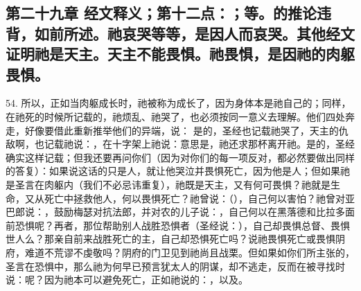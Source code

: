 
\subsection{第二十九章 经文释义；第十二点：；等。的推论违背，如前所述。祂哀哭等等，是因人而哀哭。其他经文证明祂是天主。天主不能畏惧。祂畏惧，是因祂的肉躯畏惧。}

54. 所以，正如当肉躯成长时，祂被称为成长了，因为身体本是祂自己的；同样，在祂死的时候所记载的，祂烦乱、祂哭了，也必须按同一意义去理解。他们四处奔走，好像要借此重新推举他们的异端，说： 是的，圣经也记载祂哭了，天主的仇敌啊，也记载祂说：，在十字架上祂说：意思是，祂还求那杯离开祂。是的，圣经确实这样记载；但我还要再问你们（因为对你们的每一项反对，都必然要做出同样的答复）：如果说这话的只是人，就让他哭泣并畏惧死亡，因为他是人；但如果祂是圣言在肉躯内（我们不必忌讳重复），祂既是天主，又有何可畏惧？祂就是生命，又从死亡中拯救他人，何以畏惧死亡？祂曾说：（），自己何以害怕？祂曾对亚巴郎说：，鼓励梅瑟对抗法郎，并对农的儿子说：，自己何以在黑落德和比拉多面前恐惧呢？再者，那位帮助别人战胜恐惧者（圣经说：），自己却畏惧总督、畏惧世人么？那亲自前来战胜死亡的主，自己却恐惧死亡吗？说祂畏惧死亡或畏惧阴府，难道不荒谬不虔敬吗？阴府的门卫见到祂尚且战栗。但如果如你们所主张的，圣言在恐惧中，那么祂为何早已预言犹太人的阴谋，却不逃走，反而在被寻找时说：呢？因为祂本可以避免死亡，正如祂说的：，以及。\par

